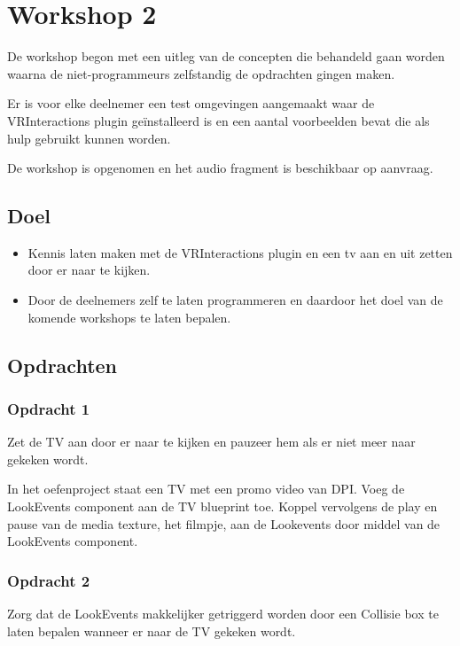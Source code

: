 
\chapter{Workshop 2}
\label{appendix:workshop2}
\lhead{}
De workshop begon met een uitleg van de concepten die behandeld gaan worden waarna de niet-programmeurs zelfstandig de opdrachten gingen maken.

Er is voor elke deelnemer een test omgevingen aangemaakt waar de VRInteractions plugin geïnstalleerd is en een aantal voorbeelden bevat die als hulp gebruikt kunnen worden.

De workshop is opgenomen en het audio fragment is beschikbaar op aanvraag.

\section{Doel}
\begin{itemize}
	\item Kennis laten maken met de VRInteractions plugin en een tv aan en uit zetten door er naar te kijken.
	\item Door de deelnemers zelf te laten programmeren en daardoor het doel van de komende workshops te laten bepalen. 
\end{itemize}

\section{Opdrachten}

\subsection*{Opdracht 1}
Zet de TV aan door er naar te kijken en pauzeer hem als er niet meer naar gekeken wordt.

In het oefenproject staat een TV met een promo video van DPI. 
Voeg de LookEvents component aan de TV blueprint toe.
Koppel vervolgens de play en pause van de media texture, het filmpje, aan de Lookevents door middel van de LookEvents component.

\subsection*{Opdracht 2}
Zorg dat de LookEvents makkelijker getriggerd worden door een Collisie box te laten bepalen wanneer er naar de TV gekeken wordt.

